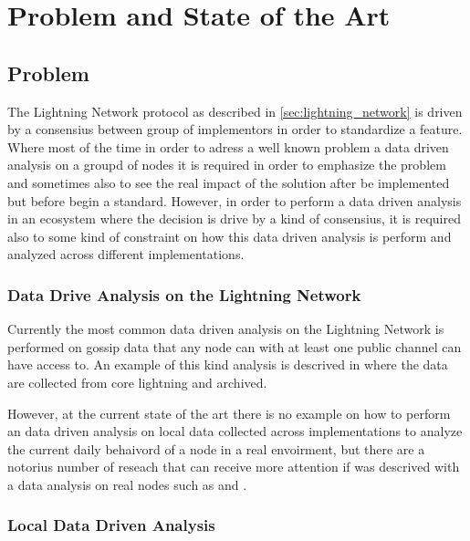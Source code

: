 \chapter{Problem and State of the Art}

\section{Problem}

The Lightning Network protocol as described in \ref{sec:lightning_network} is 
driven by a consensius between group of implementors in order to standardize
a feature. Where most of the time in order to adress a well known problem a data 
driven analysis on a groupd of nodes it is required in order to emphasize the
problem and sometimes also to see the real impact of the solution after be 
implemented but before begin a standard.
However, in order to perform a data driven analysis in an ecosystem where the decision
is drive by a kind of consensius, it is required also to some kind of 
constraint on how this data driven analysis is perform and analyzed across 
different implementations.

\subsection{Data Drive Analysis on the Lightning Network}

Currently the most common data driven analysis on the Lightning Network is performed 
on gossip data that any node can with at least one public channel can 
have access to. An example of this kind analysis is descrived in \cite{lngossip}
where the data are collected from core lightning and archived.

However, at the current state of the art there is no example on how to perform
an data driven analysis on local data collected across implementations to 
analyze the current daily behaivord of a node in a real envoirment, but there
are a notorius number of reseach that can receive more attention if was 
descrived with a data analysis on real nodes such as \cite{DBLP:journals/corr/abs-2103-08576} 
and \cite{cryptoeprint:2022/1454}.


\subsection{Local Data Driven Analysis}

